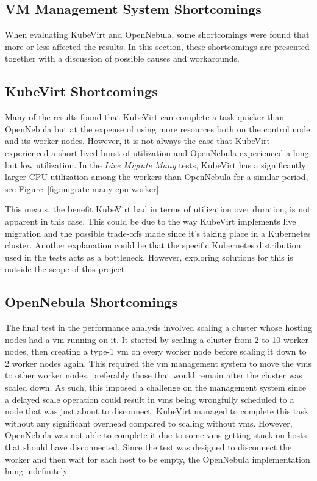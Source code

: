 \documentclass{kththesis}
\begin{document}
\begin{enumerate}
\section{VM Management System Shortcomings}
When evaluating KubeVirt and OpenNebula, some shortcomings were found that more or less affected the results. In this section, these shortcomings are presented together with a discussion of possible causes and workarounds. 

\subsection{KubeVirt Shortcomings}
Many of the results found that KubeVirt can complete a task quicker than OpenNebula but at the expense of using more resources both on the control node and its worker nodes. However, it is not always the case that KubeVirt experienced a short-lived burst of utilization and OpenNebula experienced a long but low utilization. In the \textit{Live Migrate Many} tests, KubeVirt has a significantly larger CPU utilization among the workers than OpenNebula for a similar period, see Figure\ \ref{fig:migrate-many-cpu-worker}. 

This means, the benefit KubeVirt had in terms of utilization over duration, is not apparent in this case. This could be due to the way KubeVirt implements live migration and the possible trade-offs made since it's taking place in a Kubernetes cluster. Another explanation could be that the specific Kubernetes distribution used in the tests acts as a bottleneck. However, exploring solutions for this is outside the scope of this project.

\subsection{OpenNebula Shortcomings}
The final test in the performance analysis involved scaling a cluster whose hosting nodes had a \Gls{vm} running on it. It started by scaling a cluster from 2 to 10 worker nodes, then creating a type-1 \Gls{vm} on every worker node before scaling it down to 2 worker nodes again. This required the \Gls{vm} management system to move the \Glspl{vm} to other worker nodes, preferably those that would remain after the cluster was scaled down. As such, this imposed a challenge on the management system since a delayed scale operation could result in \Glspl{vm} being wrongfully scheduled to a node that was just about to disconnect. KubeVirt managed to complete this task without any significant overhead compared to scaling without \Glspl{vm}. However, OpenNebula was not able to complete it due to some \Glspl{vm} getting stuck on hosts that should have disconnected. Since the test was designed to disconnect the worker and then wait for each host to be empty, the OpenNebula implementation hung indefinitely. 


\end{enumerate}
\end{document}
